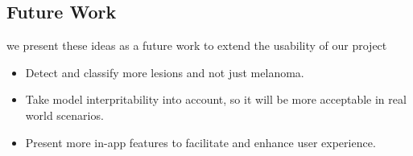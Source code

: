         
        
\subsection{Future Work}
    we present these ideas as a future work to extend the usability of our project
    \begin{itemize}
        \item Detect and classify more lesions and not just melanoma.
        \item Take model interpritability into account, so it will be more acceptable in real world scenarios.
        \item Present more in-app features to facilitate and enhance user experience. 
    \end{itemize}